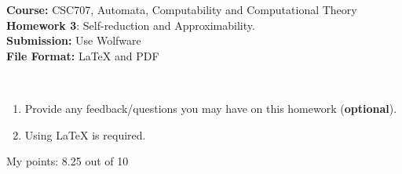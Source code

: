 \documentclass{article}%
\newcommand{\add}[1]{\textcolor{dkgreen}{#1}}
\begin{document}
\begin{flushleft}
\textbf{Course:} CSC707, Automata, Computability and Computational Theory\\
\textbf{Homework 3}: Self-reduction and Approximability. \\
\textbf{Submission:} Use Wolfware\\
\textbf{File Format:} LaTeX and PDF\\
\end{flushleft}

\begin{center}
\\
\begin{enumerate}
	\item Provide any feedback/questions you may have on this homework (\textbf{optional}).
	\item Using LaTeX is required.
\end{enumerate}\end{center}

\noindent{\hrulefill}

\bigskip

	\add{	My points: 8.25 out of 10}
\end{document}
